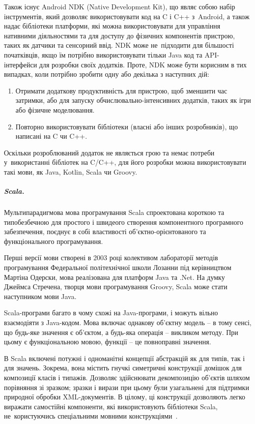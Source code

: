 \documentclass[../main.tex]{subfiles}
\begin{document}
Також існує Android NDK (Native Development Kit), що являє собою набір інструментів, який дозволяє використовувати код на C і C++ з~Android, а також надає бібліотеки платформи, які можна використовувати для управління нативними діяльностями та для доступу до фізичних компонентів пристрою, таких як датчики та сенсорний ввід. NDK може не~підходити для більшості початківців, якщо їм потрібно використовувати тільки Java код та API-інтерфейси для розробки своїх додатків. Проте, NDK може бути корисним в тих випадках, коли потрібно зробити одну або декілька з наступних дій:

\begin{enumerate}
	\item Отримати додаткову продуктивність для пристрою, щоб зменшити час затримки, або для запуску обчислювально-інтенсивних додатків, таких як ігри або фізичне моделювання.
	\item Повторно використовувати бібліотеки (власні або інших розробників), що написані на C чи C++.
\end{enumerate}

Оскільки розроблюваний додаток не являється грою та немає потреби у~використанні бібліотек на C/C++, для його розробки можна використовувати такі мови, як Java, Kotlin, Scala чи Groovy.

\subparagraph{Scala.}
Мультипарадигмова мова програмування Scala спроектована короткою та типобезбечною для простого і швидеого створення компонентного програмного забезпечення, поєднує в собі властивості об'єктно-орієнтованого та функціонального програмування. 

Перші версії мови створені в 2003 році колективом лабораторії методів програмування Федеральної політехнічної школи Лозанни під керівництвом Мартіна Одерски, мова реалізована для платформ Java та .Net. На думку Джеймса Стречена, творця мови програмування Groovy, Scala може стати наступником мови Java.

Scala-програми багато в чому схожі на Java-програми, і можуть вільно взаємодіяти з Java-кодом. Мова включає однакову об'єктну модель -- в тому сенсі, що будь-яке значення є об'єктом, а будь-яка операція -- викликом методу. При цьому є функціональною мовою, функції -- це повноправні значення.

В Scala включені потужні і одноманітні концепції абстракцій як для типів, так і для значень. Зокрема, вона містить гнучкі симетричні конструкції домішок для композиції класів і типажів. Дозволяє здійснювати декомпозицію об'єктів шляхом порівняння зі зразком; зразки і вирази при цьому були узагальнені для підтримки природної обробки \mbox{XML-документів}. В цілому, ці конструкції дозволяють легко виражати самостійні компоненти, які використовують бібліотеки Scala, не~користуючись спеціальними мовними конструкціями~\cite{scala}.
\end{document}
